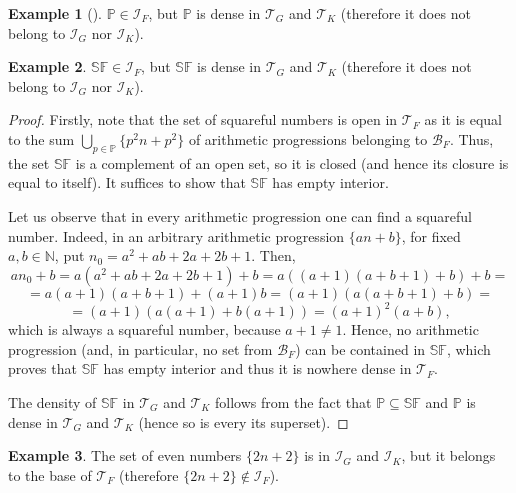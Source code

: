 \documentclass{amsart}
\theoremstyle{definition}
\theoremstyle{definition}
\newtheorem{ex}{Example}
\newcommand{\N}{{\mathbb N}}
\newcommand{\I}{\mathcal I}
\newcommand{\T}{\mathcal{T}}
\newcommand{\SqrFr}{\mathbb{SF}}
\begin{document}
\begin{ex}[\cite{Szczuka4}] 
$\mathbb{P}\in \I_F$, but $\mathbb{P}$ is dense in $\T_G$ and $\T_K$ (therefore it does not belong to $\I_G$ nor $\I_K$).
\end{ex}

\begin{ex} 
$\SqrFr\in \I_F$, but $\SqrFr$ is dense in $\T_G$ and $\T_K$ (therefore it does not belong to $\I_G$ nor $\I_K$).
\end{ex}

\begin{proof}
Firstly, note that the set of squareful numbers is open in $\T_F$ as it is equal to the sum $\bigcup_{p\in\mathbb{P}} \{p^2 n+p^2\}$ of arithmetic progressions belonging to $\mathcal{B}_F$. Thus, the set $\SqrFr$ is a complement of an open set, so it is closed (and hence its closure is equal to itself). It suffices to show that $\SqrFr$ has empty interior.

Let us observe that in every arithmetic progression one can find a squareful number. Indeed, in an arbitrary arithmetic progression $\{an+b\}$, for fixed $a,b\in\N$, put $n_0 = a^2 +ab+2a+2b+1$. Then,
$$an_0 +b = a(a^2 +ab+2a+2b+1)+b = a((a+1)(a+b+1)+b)+b = $$
$$= a(a+1)(a+b+1)+(a+1)b = (a+1)(a(a+b+1)+b) =$$
$$= (a+1)(a(a+1)+b(a+1))= (a+1)^2 (a+b),$$
which is always a squareful number, because $a+1  \neq 1$. Hence, no arithmetic progression (and, in particular, no set from $\mathcal{B}_F$) can be contained in $\SqrFr$, which proves that $\SqrFr$ has empty interior and thus it is nowhere dense in $\T_F$.

The density of $\SqrFr$ in $\T_G$ and $\T_K$ follows from the fact that $\mathbb{P}\subseteq \SqrFr$ and $\mathbb{P}$ is dense in $\T_G$ and $\T_K$ (hence so is every its superset).
\end{proof}

\begin{ex} 
The set of even numbers $\{2n+2\}$ is in $\I_G$ and $\I_K$, but it belongs to the base of $\T_F$ (therefore $\{2n+2\}\notin \I_F$).
\end{ex}
\end{document}
